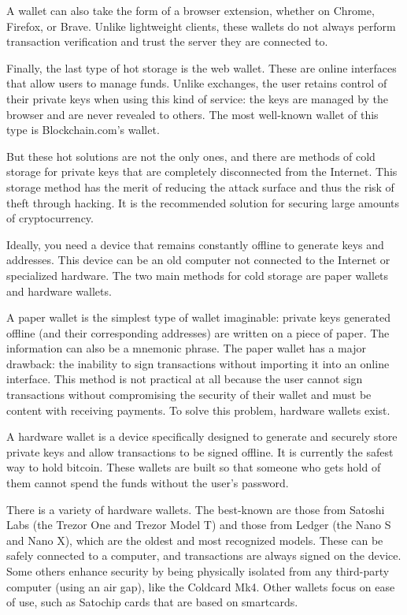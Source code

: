\documentclass[
  a5paper,
  smalldemyvopaper,10pt,twoside,onecolumn,openright,extrafontsizes,hidelinks]{memoir}
\begin{document}
A wallet can also take the form of a browser extension, whether on
Chrome, Firefox, or Brave. Unlike lightweight clients, these wallets do
not always perform transaction verification and trust the server they
are connected to.

Finally, the last type of hot storage is the web wallet. These are
online interfaces that allow users to manage funds. Unlike exchanges,
the user retains control of their private keys when using this kind of
service: the keys are managed by the browser and are never revealed to
others. The most well-known wallet of this type is Blockchain.com's
wallet.

But these hot solutions are not the only ones, and there are methods of
cold storage for private keys that are completely disconnected from the
Internet. This storage method has the merit of reducing the attack
surface and thus the risk of theft through hacking. It is the
recommended solution for securing large amounts of cryptocurrency.

Ideally, you need a device that remains constantly offline to generate
keys and addresses. This device can be an old computer not connected to
the Internet or specialized hardware. The two main methods for cold
storage are paper wallets and hardware wallets.

A paper wallet is the simplest type of wallet imaginable: private keys
generated offline (and their corresponding addresses) are written on a
piece of paper. The information can also be a mnemonic phrase. The paper
wallet has a major drawback: the inability to sign transactions without
importing it into an online interface. This method is not practical at
all because the user cannot sign transactions without compromising the
security of their wallet and must be content with receiving payments. To
solve this problem, hardware wallets exist.

A hardware wallet is a device specifically designed to generate and
securely store private keys and allow transactions to be signed offline.
It is currently the safest way to hold bitcoin. These wallets are built
so that someone who gets hold of them cannot spend the funds without the
user's password.

There is a variety of hardware wallets. The best-known are those from
Satoshi Labs (the Trezor One and Trezor Model T) and those from Ledger
(the Nano S and Nano X), which are the oldest and most recognized
models. These can be safely connected to a computer, and transactions
are always signed on the device. Some others enhance security by being
physically isolated from any third-party computer (using an air gap),
like the Coldcard Mk4. Other wallets focus on ease of use, such as
Satochip cards that are based on smartcards.
\end{document}

